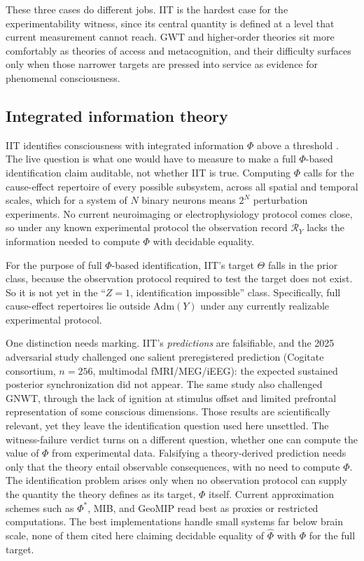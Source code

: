 \documentclass[11pt]{article}
\begin{document}
These three cases do different jobs. IIT is the hardest case for the
experimentability witness, since its central quantity is defined at a level that
current measurement cannot reach. GWT and higher-order theories sit more
comfortably as theories of access and metacognition, and their difficulty
surfaces only when those narrower targets are pressed into service as evidence
for phenomenal consciousness.

\subsection{Integrated information theory}
\label{sec:iit}

IIT identifies consciousness with integrated information $\Phi$ above a threshold
\citep{tononi2016}. The live question is what one would have to measure to make a
full $\Phi$-based identification claim auditable, not whether IIT is true. Computing $\Phi$ calls for the cause-effect repertoire of every
possible subsystem, across all spatial and temporal scales, which for a system
of $N$ binary neurons means $2^N$ perturbation experiments. No current
neuroimaging or electrophysiology protocol comes close, so under any known
experimental protocol the observation record $\mathcal{R}_Y$ lacks the
information needed to compute $\Phi$ with decidable equality.

For the purpose of full $\Phi$-based identification, IIT's target $\Theta$ falls
in the prior class, because the observation protocol required to test the target
does not exist. So it is not yet in the ``$Z = 1$, identification impossible''
class. Specifically, full cause-effect repertoires lie outside
$\mathrm{Adm}(Y)$ under any currently realizable experimental protocol.

One distinction needs marking. IIT's \emph{predictions} are falsifiable, and the
2025 adversarial study challenged one salient preregistered prediction
\citep{cogitate2025} (Cogitate consortium, $n = 256$, multimodal
fMRI/MEG/iEEG): the expected sustained posterior synchronization did not appear.
The same study also challenged GNWT, through the lack of ignition at stimulus
offset and limited prefrontal representation of some conscious dimensions. Those
results are scientifically relevant, yet they leave the identification question
used here unsettled. The witness-failure verdict turns on a different question,
whether one can compute the value of $\Phi$ from experimental data. Falsifying a
theory-derived prediction needs only that the theory entail observable
consequences, with no need to compute $\Phi$. The identification problem arises only
when no observation protocol can supply the quantity the theory defines as its
target, $\Phi$ itself.
Current approximation schemes such as $\Phi^*$, MIB, and GeoMIP read best as
proxies or restricted computations. The best implementations handle small
systems far below brain scale, none of them cited here claiming decidable
equality of $\hat\Phi$ with $\Phi$ for the full target.
\end{document}
